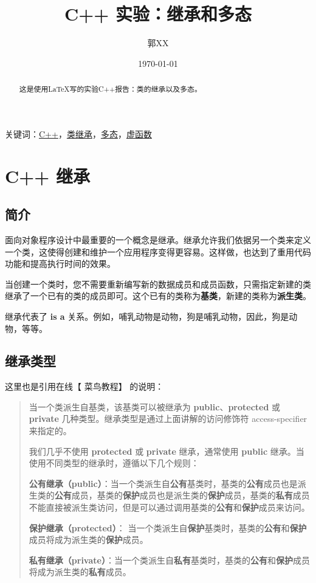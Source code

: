 \documentclass[UTF8,18pt]{ctexart}
\title{\heiti C++ 实验：继承和多态}
\author{\kaishu 郭XX}
\affil{\small{xxxxxxxxx，物联网 xxxx，XX 大学}}
\date{\today}
\newenvironment{myquote}
{\begin{quote}\kaishu\zihao{-5}}
	{\end{quote}}
\begin{document}
\maketitle
\begin{abstract}
这是使用\LaTeX 写的实验C++报告：类的继承以及多态。
\end{abstract}
{\small 关键词：\underline{C++}，\underline{类继承}，\underline{多态}，\underline{虚函数}}

\tableofcontents
\section{C++ 继承}
\subsection{简介}
面向对象程序设计中最重要的一个概念是继承。继承允许我们依据另一个类来定义一个类，这使得创建和维护一个应用程序变得更容易。这样做，也达到了重用代码功能和提高执行时间的效果。

当创建一个类时，您不需要重新编写新的数据成员和成员函数，只需指定新建的类继承了一个已有的类的成员即可。这个已有的类称为\textbf{基类}，新建的类称为\textbf{派生类}。

继承代表了 \textbf{is a }关系。例如，哺乳动物是动物，狗是哺乳动物，因此，狗是动物，等等。
\subsection{继承类型}
这里也是引用在线【 菜鸟教程】 的说明：
\begin{myquote}
当一个类派生自基类，该基类可以被继承为 \textbf{public}、\textbf{protected} 或 \textbf{private} 几种类型。继承类型是通过上面讲解的访问修饰符 access-specifier 来指定的。

我们几乎不使用 \textbf{protected }或 \textbf{private }继承，通常使用 \textbf{public} 继承。当使用不同类型的继承时，遵循以下几个规则：

\textbf{公有继承（public）}：当一个类派生自\textbf{公有}基类时，基类的\textbf{公有}成员也是派生类的\textbf{公有}成员，基类的\textbf{保护}成员也是派生类的\textbf{保护}成员，基类的\textbf{私有}成员不能直接被派生类访问，但是可以通过调用基类的\textbf{公有}和\textbf{保护}成员来访问。

\textbf{保护继承（protected）}： 当一个类派生自\textbf{保护}基类时，基类的\textbf{公有}和\textbf{保护}成员将成为派生类的\textbf{保护}成员。

\textbf{私有继承（private）}：当一个类派生自\textbf{私有}基类时，基类的\textbf{公有}和\textbf{保护}成员将成为派生类的\textbf{私有}成员。
\end{myquote}
\end{document}
